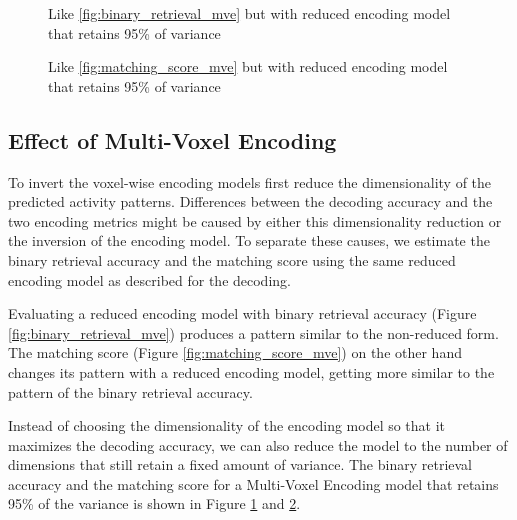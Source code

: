 \begin{figure}
  \centering
  \def\svgwidth{\linewidth}
  
	
  \caption{Like \ref{fig:binary_retrieval_mve} but with reduced encoding model that retains 95\% of
  variance}

 \label{fig:binary_retrieval_mve_2}
\end{figure}


\begin{figure}
  \centering
  \def\svgwidth{\linewidth}
  
	
  \caption{Like \ref{fig:matching_score_mve} but with reduced encoding model that retains 95\% of
  variance}

 \label{fig:matching_score_mve_2}
\end{figure}


\subsection*{Effect of Multi-Voxel Encoding}

To invert the voxel-wise encoding models \citet{NG11} first reduce the
dimensionality of the predicted activity patterns. Differences between the
decoding accuracy and the two encoding metrics might be caused by either this
dimensionality reduction or the inversion of the encoding model. To separate
these causes, we estimate the binary retrieval accuracy and the matching score
using the same reduced encoding model as described for the decoding.

Evaluating a reduced encoding model with binary retrieval accuracy (Figure
\ref{fig:binary_retrieval_mve}) produces a pattern similar to the non-reduced
form. The matching score (Figure \ref{fig:matching_score_mve}) on the other hand
changes its pattern with a reduced encoding model, getting more similar to the
pattern of the binary retrieval accuracy.

Instead of choosing the dimensionality of the encoding model so that it
maximizes the decoding accuracy, we can also reduce the model to the number of dimensions
that still retain a fixed amount of variance. The binary retrieval accuracy and
the matching score for a Multi-Voxel Encoding model that retains 95\% of the variance is shown in
Figure \ref{fig:binary_retrieval_mve_2} and \ref{fig:matching_score_mve_2}.


